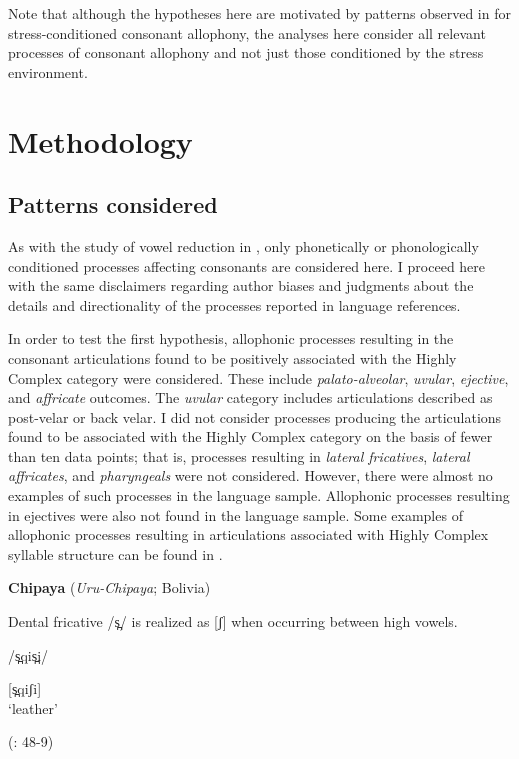   Note that although the hypotheses here are motivated by patterns observed in  for stress-conditioned consonant allophony, the analyses here consider all relevant processes of consonant allophony and not just those conditioned by the stress environment.

\section{Methodology}\label{sec:7.2}
\subsection{Patterns considered}\label{sec:7.2.1}

  As with the study of vowel reduction in , only phonetically or phonologically conditioned processes affecting consonants are considered here. I proceed here with the same disclaimers regarding author biases and judgments about the details and directionality of the processes reported in language references.

  In order to test the first hypothesis, allophonic processes resulting in the consonant articulations found to be positively associated with the Highly Complex category were considered. These include \textit{palato-alveolar}, \textit{uvular}, \textit{ejective}, and \textit{affricate} outcomes. The \textit{uvular} category includes articulations described as post-velar or back velar. I did not consider processes producing the articulations found to be associated with the Highly Complex category on the basis of fewer than ten data points; that is, processes resulting in \textit{lateral fricatives}, \textit{lateral affricates}, and \textit{pharyngeals} were not considered. However, there were almost no examples of such processes in the language sample. Allophonic processes resulting in ejectives were also not found in the language sample. Some examples of allophonic processes resulting in articulations associated with Highly Complex syllable structure can be found in .

\ea\label{ex:7.3}
  \textbf{Chipaya} (\textit{Uru-Chipaya}; Bolivia)

Dental fricative /s̪/ is realized as [ʃ] when occurring between high vowels.

/s̪qis̪i/

[s̪qiʃi]\\
\glt ‘leather’

(\citealt{Cerrón-Palomino2006}: 48-9)
\z

